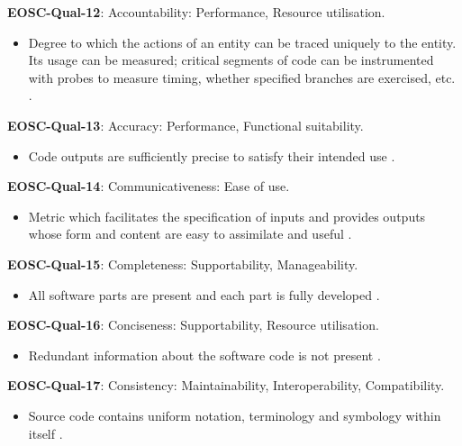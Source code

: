 \textbf{EOSC-Qual-12}: Accountability: Performance, Resource utilisation.

\begin{itemize}
    \item Degree to which the actions of an entity can be traced uniquely to the entity. Its usage can be measured; critical segments of code can be instrumented with probes to measure timing, whether specified branches are exercised, etc. \cite{iso_25010_2011_2017,boehm_quantitative_1976}.
\end{itemize}

\textbf{EOSC-Qual-13}: Accuracy: Performance, Functional suitability.

\begin{itemize}
    \item Code outputs are sufficiently precise to satisfy their intended use \cite{boehm_quantitative_1976}.
\end{itemize}

\textbf{EOSC-Qual-14}: Communicativeness: Ease of use.

\begin{itemize}
    \item Metric which facilitates the specification of inputs and provides outputs whose form and content are easy to assimilate and useful \cite{boehm_quantitative_1976,raymond_software_2013}.
\end{itemize}

\textbf{EOSC-Qual-15}: Completeness: Supportability, Manageability.

\begin{itemize}
    \item All software parts are present and each part is fully developed \cite{iso_25010_2011_2017,boehm_quantitative_1976}.
\end{itemize}

\textbf{EOSC-Qual-16}: Conciseness: Supportability, Resource utilisation.

\begin{itemize}
    \item Redundant information about the software code is not present \cite{boehm_quantitative_1976}.
\end{itemize}

\textbf{EOSC-Qual-17}: Consistency: Maintainability, Interoperability, Compatibility.

\begin{itemize}
    \item Source code contains uniform notation, terminology and symbology within itself \cite{boehm_quantitative_1976,raymond_software_2013}.
\end{itemize}

